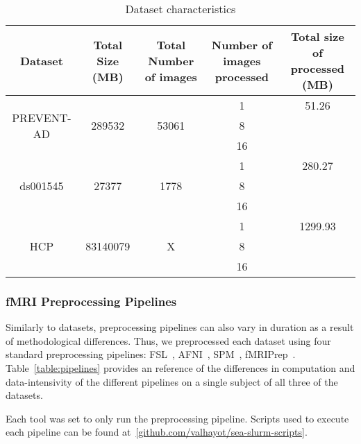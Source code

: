\documentclass[10pt,journal,compsoc]{IEEEtran}
\begin{document}
\begin{table*}[t]
  \small\centering
\begin{tabular}{|c c c c c|}
  \hline
  Dataset & Total Size (MB) & Total Number of images & Number of images processed & Total size of processed (MB) \\
  \hline
  \multirow{3}{*}{PREVENT-AD} & \multirow{3}{*}{289532} & \multirow{3}{*}{53061} & 1 & 51.26\\
  & & & 8 & \\
  & & & 16 & \\
  \hline
  \multirow{3}{*}{ds001545} & \multirow{3}{*}{27377} & \multirow{3}{*}{1778} & 1 & 280.27\\
  & & & 8 & \\
  & & & 16 & \\
  \hline
  \multirow{3}{*}{HCP} & \multirow{3}{*}{83140079} & \multirow{3}{*}{X} & 1 &  1299.93\\
  & & & 8 & \\
  & & & 16 & \\


  \hline

  \hline
\end{tabular}\caption{Dataset characteristics}\label{table:data}
\end{table*}



\subsubsection{fMRI Preprocessing Pipelines}

Similarly to datasets, preprocessing pipelines can also vary in duration as a result of methodological differences.
Thus, we preprocessed each dataset using four standard preprocessing pipelines: FSL~\cite{fsl}, AFNI~\cite{AFNI},
SPM~\cite{SPM}, fMRIPrep~\cite{fmriprep}. Table~\ref{table:pipelines} provides an reference of the differences in computation and data-intensivity
of the different pipelines on a single subject of all three of the datasets.

Each tool was set to only run the preprocessing pipeline. Scripts used to execute each pipeline can be found at~\ref{github.com/valhayot/sea-slurm-scripts}.
\end{document}
